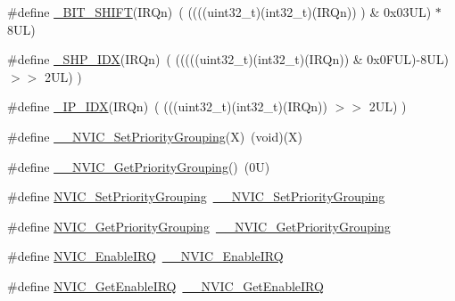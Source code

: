 \begin{DoxyCompactItemize}
\item 
\#define \hyperlink{group___c_m_s_i_s___core___n_v_i_c_functions_ga53c75b28823441c6153269f0ecbed878}{\+\_\+\+B\+I\+T\+\_\+\+S\+H\+I\+FT}(I\+R\+Qn)~(  ((((uint32\+\_\+t)(int32\+\_\+t)(I\+R\+Qn))         )      \&  0x03\+U\+L) $\ast$ 8\+U\+L)
\item 
\#define \hyperlink{group___c_m_s_i_s___core___n_v_i_c_functions_gaee4f7eb5d7e770ad51489dbceabb1755}{\+\_\+\+S\+H\+P\+\_\+\+I\+DX}(I\+R\+Qn)~( (((((uint32\+\_\+t)(int32\+\_\+t)(I\+R\+Qn)) \& 0x0\+F\+U\+L)-\/8\+U\+L) $>$$>$    2\+U\+L)      )
\item 
\#define \hyperlink{group___c_m_s_i_s___core___n_v_i_c_functions_ga370ec4b1751a6a889d849747df3763a9}{\+\_\+\+I\+P\+\_\+\+I\+DX}(I\+R\+Qn)~(   (((uint32\+\_\+t)(int32\+\_\+t)(I\+R\+Qn))                $>$$>$    2\+U\+L)      )
\item 
\#define \hyperlink{group___c_m_s_i_s___core___n_v_i_c_functions_ga6834dd8c9c59394f1b544b57665293a4}{\+\_\+\+\_\+\+N\+V\+I\+C\+\_\+\+Set\+Priority\+Grouping}(X)~(void)(X)
\item 
\#define \hyperlink{group___c_m_s_i_s___core___n_v_i_c_functions_gab2072fe50f6d7cd208f6768919f59fae}{\+\_\+\+\_\+\+N\+V\+I\+C\+\_\+\+Get\+Priority\+Grouping}()~(0\+U)
\item 
\#define \hyperlink{group___c_m_s_i_s___core___n_v_i_c_functions_ga0e798d5aec68cdd8263db86a76df788f}{N\+V\+I\+C\+\_\+\+Set\+Priority\+Grouping}~\hyperlink{group___c_m_s_i_s___core___n_v_i_c_functions_gafc94dcbaee03e4746ade1f5bb9aaa56d}{\+\_\+\+\_\+\+N\+V\+I\+C\+\_\+\+Set\+Priority\+Grouping}
\item 
\#define \hyperlink{group___c_m_s_i_s___core___n_v_i_c_functions_ga4eeb9214f2264fc23c34ad5de2d3fa11}{N\+V\+I\+C\+\_\+\+Get\+Priority\+Grouping}~\hyperlink{group___c_m_s_i_s___core___n_v_i_c_functions_ga9b894af672df4373eb637f8288845c05}{\+\_\+\+\_\+\+N\+V\+I\+C\+\_\+\+Get\+Priority\+Grouping}
\item 
\#define \hyperlink{group___c_m_s_i_s___core___n_v_i_c_functions_ga57b3064413dbc7459d9646020fdd8bef}{N\+V\+I\+C\+\_\+\+Enable\+I\+RQ}~\hyperlink{group___c_m_s_i_s___core___n_v_i_c_functions_ga71227e1376cde11eda03fcb62f1b33ea}{\+\_\+\+\_\+\+N\+V\+I\+C\+\_\+\+Enable\+I\+RQ}
\item 
\#define \hyperlink{group___c_m_s_i_s___core___n_v_i_c_functions_ga857de13232ec65dd15087eaa15bc4a69}{N\+V\+I\+C\+\_\+\+Get\+Enable\+I\+RQ}~\hyperlink{group___c_m_s_i_s___core___n_v_i_c_functions_gaaeb5e7cc0eaad4e2817272e7bf742083}{\+\_\+\+\_\+\+N\+V\+I\+C\+\_\+\+Get\+Enable\+I\+RQ}

\end{DoxyCompactItemize}
